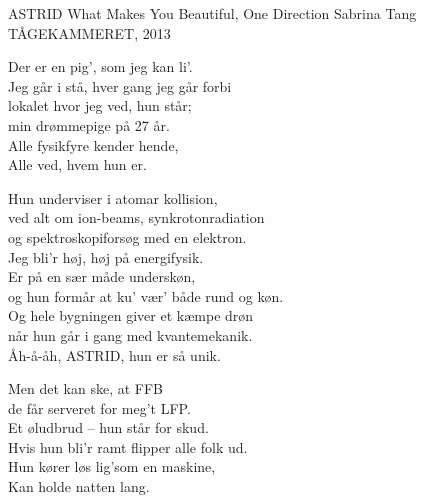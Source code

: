 \begin{song}{ASTRID}
  {} %
  {What Makes You Beautiful, One Direction} %
  {Sabrina Tang} %
  {TÅGEKAMMERET, 2013} %
  {\NotCCLIed} %

  \begin{SBVerse}
    Der er en pig’, som jeg kan li’.\\
    Jeg går i stå, hver gang jeg går forbi\\
    lokalet hvor jeg ved, hun står;\\
    min drømmepige på 27 år.\\\medskip
    Alle fysikfyre kender hende,\\
    Alle ved, hvem hun er.
  \end{SBVerse}

  \begin{SBChorus}
    Hun underviser i atomar kollision,\\
    ved alt om ion-beams, synkrotonradiation\\
    og spektroskopiforsøg med en elektron.\\
    Jeg bli’r høj, høj på energifysik.\\\medskip
    Er på en sær måde underskøn,\\
    og hun formår at ku’ vær’ både rund og køn.\\
    Og hele bygningen giver et kæmpe drøn\\
    når hun går i gang med kvantemekanik.\\
    Åh-å-åh, ASTRID, hun er så unik.
  \end{SBChorus}

  \begin{SBVerse}
    Men det kan ske, at FFB\\
    de får serveret for meg’t LFP.\\
    Et øludbrud – hun står for skud.\\
    Hvis hun bli’r ramt flipper alle folk ud.\\\medskip
    Hun kører løs lig’som en maskine,\\
    Kan holde natten lang.
  \end{SBVerse}


\end{song}
